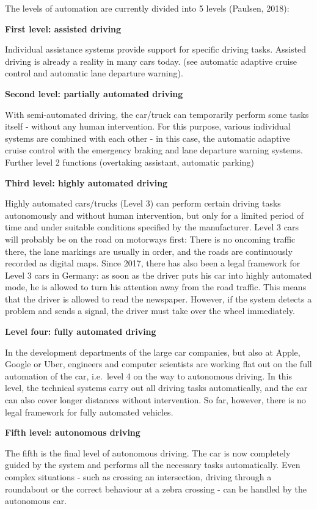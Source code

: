 \documentclass[
]{book}
\begin{document}
The levels of automation are currently divided into 5 levels (Paulsen, 2018):

\textbf{First level: assisted driving}

Individual assistance systems provide support for specific driving tasks. Assisted driving is already a reality in many cars today. (see automatic adaptive cruise control and automatic lane departure warning).

\textbf{Second level: partially automated driving}

With semi-automated driving, the car/truck can temporarily perform some tasks itself - without any human intervention. For this purpose, various individual systems are combined with each other - in this case, the automatic adaptive cruise control with the emergency braking and lane departure warning systems. Further level 2 functions (overtaking assistant, automatic parking)

\textbf{Third level: highly automated driving}

Highly automated cars/trucks (Level 3) can perform certain driving tasks autonomously and without human intervention, but only for a limited period of time and under suitable conditions specified by the manufacturer. Level 3 cars will probably be on the road on motorways first: There is no oncoming traffic there, the lane markings are usually in order, and the roads are continuously recorded as digital maps. Since 2017, there has also been a legal framework for Level 3 cars in Germany: as soon as the driver puts his car into highly automated mode, he is allowed to turn his attention away from the road traffic. This means that the driver is allowed to read the newspaper.
However, if the system detects a problem and sends a signal, the driver must take over the wheel immediately.

\textbf{Level four: fully automated driving}

In the development departments of the large car companies, but also at Apple, Google or Uber, engineers and computer scientists are working flat out on the full automation of the car, i.e.~level 4 on the way to autonomous driving. In this level, the technical systems carry out all driving tasks automatically, and the car can also cover longer distances without intervention.
So far, however, there is no legal framework for fully automated vehicles.

\textbf{Fifth level: autonomous driving}

The fifth is the final level of autonomous driving. The car is now completely guided by the system and performs all the necessary tasks automatically. Even complex situations - such as crossing an intersection, driving through a roundabout or the correct behaviour at a zebra crossing - can be handled by the autonomous car.
\end{document}
